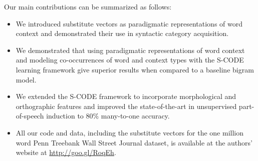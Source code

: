 \documentclass[11pt]{article}
\begin{document}
Our main contributions can be summarized as follows:
\begin{itemize}
\item We introduced substitute vectors as paradigmatic representations
  of word context and demonstrated their use in syntactic category
  acquisition.
\item We demonstrated that using paradigmatic representations of word
  context and modeling co-occurrences of word and context types with
  the S-CODE learning framework give superior results when compared to
  a baseline bigram model.
\item We extended the S-CODE framework to incorporate morphological
  and orthographic features and improved the state-of-the-art in
  unsupervised part-of-speech induction to 80\% many-to-one accuracy.
\item All our code and data, including the substitute vectors for the
  one million word Penn Treebank Wall Street Journal dataset, is
  available at the authors' website at \mbox{\url{http://goo.gl/RoqEh}}.
\end{itemize}




\end{document}
